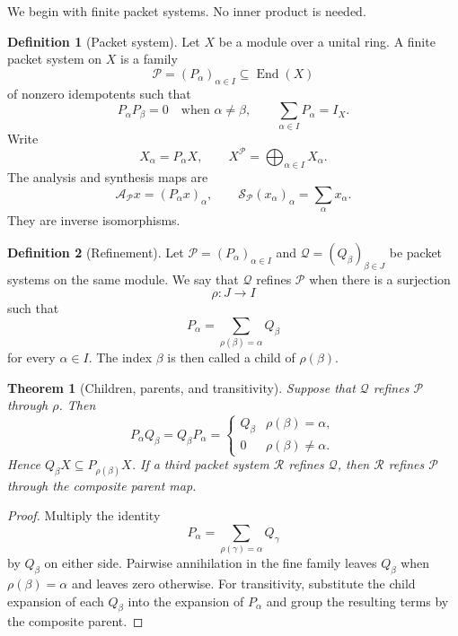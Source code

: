 \documentclass[11pt,a4paper]{article}
\newtheorem{theorem}{Theorem}[section]
\theoremstyle{definition}
\newtheorem{definition}[definition]{Definition}
\theoremstyle{remark}
\newcommand{\Acal}{\mathcal A}
\newcommand{\Pcal}{\mathcal P}
\newcommand{\Qcal}{\mathcal Q}
\newcommand{\Scal}{\mathcal S}
\newcommand{\Rcal}{\mathcal R}
\newcommand{\End}{\operatorname{End}}
\providecommand{\End}{\operatorname{End}}
\theoremstyle{definition}\newtheorem{construction}[theorem]{Construction}\newtheorem{certificate}[theorem]{Numerical Certificate}
\theoremstyle{remark}\newtheorem{boundary}[theorem]{Boundary}
\begin{document}
We begin with finite packet systems.  No inner product is needed.

\begin{definition}[Packet system]\label{def:packet_system}
Let $X$ be a module over a unital ring.  A finite packet system on $X$ is a family
\[
\Pcal=(P_\alpha)_{\alpha\in I}
\subseteq\End(X)
\]
of nonzero idempotents such that
\[
P_\alpha P_\beta=0
\quad\text{when }\alpha\ne\beta,
\qquad
\sum_{\alpha\in I}P_\alpha=I_X.
\]
Write
\[
X_\alpha=P_\alpha X,
\qquad
X^{\Pcal}=\bigoplus_{\alpha\in I}X_\alpha.
\]
The analysis and synthesis maps are
\[
\Acal_{\Pcal}x=(P_\alpha x)_\alpha,
\qquad
\Scal_{\Pcal}(x_\alpha)_\alpha=\sum_\alpha x_\alpha.
\]
They are inverse isomorphisms.
\end{definition}

\begin{definition}[Refinement]\label{def:refinement}\label{def:refinement-map}
Let $\Pcal=(P_\alpha)_{\alpha\in I}$ and $\Qcal=(Q_\beta)_{\beta\in J}$ be packet systems on the same module.  We say that $\Qcal$ refines $\Pcal$ when there is a surjection
\[
\rho:J\longrightarrow I
\]
such that
\[
P_\alpha=\sum_{\rho(\beta)=\alpha}Q_\beta
\]
for every $\alpha\in I$.  The index $\beta$ is then called a child of $\rho(\beta)$.
\end{definition}

\begin{theorem}[Children, parents, and transitivity]\label{thm:children_transitivity}\label{thm:nested-refinement}
Suppose that $\Qcal$ refines $\Pcal$ through $\rho$.  Then
\[
P_\alpha Q_\beta
=
Q_\beta P_\alpha
=
\begin{cases}
Q_\beta & \rho(\beta)=\alpha,\\
0 & \rho(\beta)\ne\alpha.
\end{cases}
\]
Hence $Q_\beta X\subseteq P_{\rho(\beta)}X$.  If a third packet system $\Rcal$ refines $\Qcal$, then $\Rcal$ refines $\Pcal$ through the composite parent map.
\end{theorem}

\begin{proof}
Multiply the identity
\[
P_\alpha=\sum_{\rho(\gamma)=\alpha}Q_\gamma
\]
by $Q_\beta$ on either side.  Pairwise annihilation in the fine family leaves $Q_\beta$ when $\rho(\beta)=\alpha$ and leaves zero otherwise.  For transitivity, substitute the child expansion of each $Q_\beta$ into the expansion of $P_\alpha$ and group the resulting terms by the composite parent.
\end{proof}
\end{document}
